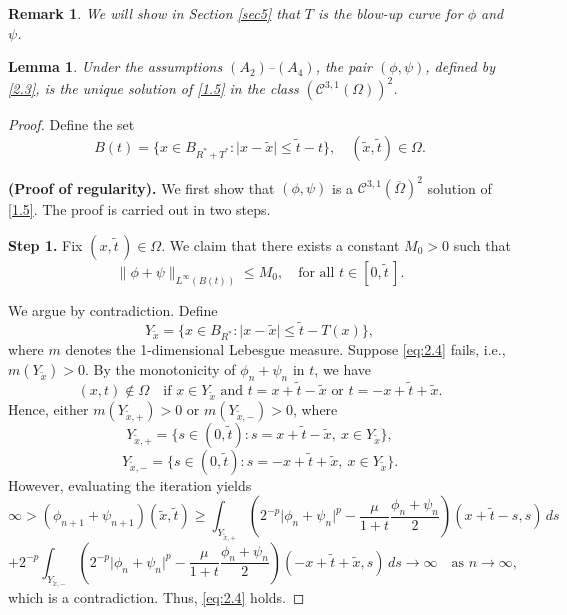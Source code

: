 \documentclass[
  sn-mathphys-num,
  colorlinks,
  linkcolor=darkmagenta,
  citecolor=rufous,
  urlcolor=zaffre,
  hypertexnames=false
]{sn-jnl}
\numberwithin{equation}{section}
\newtheorem{lemma}[theorem]{Lemma}%
\newtheorem{remark}[theorem]{Remark}%
\begin{document}
\begin{remark}
\emph{We will show in Section \ref{sec5} that $T$ is the blow-up curve for $\phi$ and $\psi$.}
\end{remark}

\begin{lemma}\label{lemma 2.3}
  Under the assumptions $(A_2)$--$(A_4)$, the pair $(\phi, \psi)$,  defined by \eqref{2.3}, is the unique solution of \eqref{1.5} in the class $(\mathcal{C}^{3,1}(\Omega))^2$.
\end{lemma}
  

\begin{proof}
  Define the set
  $$
    B(t) = \bigl\{ x \in B_{R^*+T^*}: \lvert x - \tilde{x} \rvert \le \tilde{t}-t \bigr\}, \quad (\tilde{x}, \tilde{t}) \in \Omega.
  $$

  \medskip
  \noindent\textbf{(Proof of regularity).}  
  We first show that \((\phi, \psi)\) is a \(\mathcal{C}^{3,1}(\overline{\Omega})^2\) solution of \eqref{1.5}.  
  The proof is carried out in two steps.

  \smallskip
  \noindent\textbf{Step 1.}  
  Fix \((x, \tilde{t}\,) \in \Omega\).  
  We claim that there exists a constant \(M_0 > 0\) such that
  \begin{equation}
    \label{eq:2.4}
    \lVert \phi + \psi \rVert_{L^\infty(B(t))} \le M_0, \quad \text{for all } t \in [0, \tilde{t}\,].
  \end{equation}

  \noindent We argue by contradiction. Define  
  $$
    Y_{\tilde{x}} = \{ x \in B_{R^*} : \lvert x - \tilde{x} \rvert \le \tilde{t} - T(x) \},
  $$
  where \(m\) denotes the 1-dimensional Lebesgue measure.  
  Suppose \eqref{eq:2.4} fails, i.e., \(m(Y_{\tilde{x}}) > 0\).  
  By the monotonicity of \(\phi_n + \psi_n\) in \(t\), we have  
  $$
    (x, t) \notin \Omega \quad \text{if } x \in Y_{\tilde{x}} \text{ and } t = x + \tilde{t} - \tilde{x} \text{ or } t = -x + \tilde{t} + \tilde{x}.
  $$
  Hence, either \(m(Y_{\tilde{x},+}) > 0\) or \(m(Y_{\tilde{x},-}) > 0\), where  
  $$
    Y_{\tilde{x},+} = \{ s \in (0, \tilde{t}) : s = x + \tilde{t} - \tilde{x}, \ x \in Y_{\tilde{x}} \},  
  $$
  $$
    Y_{\tilde{x},-} = \{ s \in (0, \tilde{t}) : s = -x + \tilde{t} + \tilde{x}, \ x \in Y_{\tilde{x}} \}.
  $$
  However, evaluating the iteration yields  
  $$
    \infty > (\phi_{n+1} + \psi_{n+1})(\tilde{x}, \tilde{t}) 
    \geq \int_{Y_{\tilde{x},+}} \left( 2^{-p} \lvert \phi_n + \psi_n \rvert^p - \frac{\mu}{1+t} \frac{\phi_n + \psi_n}{2} \right)(x + \tilde{t} - s, s) \, ds  
  $$
  $$
    + 2^{-p} \int_{Y_{\tilde{x},-}} \left( 2^{-p} \lvert \phi_n + \psi_n \rvert^p - \frac{\mu}{1+t} \frac{\phi_n + \psi_n}{2} \right)(-x + \tilde{t} + \tilde{x}, s) \, ds \to \infty \quad \text{as } n \to \infty,
  $$
  which is a contradiction. Thus, \eqref{eq:2.4} holds.


\end{proof}
\end{document}
